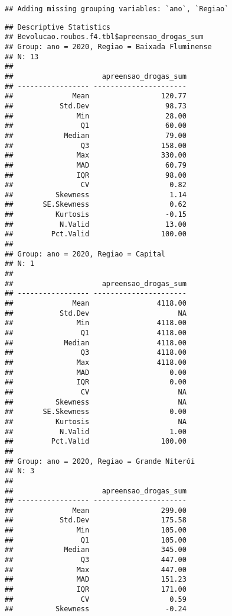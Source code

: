 \documentclass[
]{article}
\begin{document}
\begin{verbatim}
## Adding missing grouping variables: `ano`, `Regiao`
\end{verbatim}

\begin{verbatim}
## Descriptive Statistics  
## Bevolucao.roubos.f4.tbl$apreensao_drogas_sum  
## Group: ano = 2020, Regiao = Baixada Fluminense  
## N: 13  
## 
##                     apreensao_drogas_sum
## ----------------- ----------------------
##              Mean                 120.77
##           Std.Dev                  98.73
##               Min                  28.00
##                Q1                  60.00
##            Median                  79.00
##                Q3                 158.00
##               Max                 330.00
##               MAD                  60.79
##               IQR                  98.00
##                CV                   0.82
##          Skewness                   1.14
##       SE.Skewness                   0.62
##          Kurtosis                  -0.15
##           N.Valid                  13.00
##         Pct.Valid                 100.00
## 
## Group: ano = 2020, Regiao = Capital  
## N: 1  
## 
##                     apreensao_drogas_sum
## ----------------- ----------------------
##              Mean                4118.00
##           Std.Dev                     NA
##               Min                4118.00
##                Q1                4118.00
##            Median                4118.00
##                Q3                4118.00
##               Max                4118.00
##               MAD                   0.00
##               IQR                   0.00
##                CV                     NA
##          Skewness                     NA
##       SE.Skewness                   0.00
##          Kurtosis                     NA
##           N.Valid                   1.00
##         Pct.Valid                 100.00
## 
## Group: ano = 2020, Regiao = Grande Niterói  
## N: 3  
## 
##                     apreensao_drogas_sum
## ----------------- ----------------------
##              Mean                 299.00
##           Std.Dev                 175.58
##               Min                 105.00
##                Q1                 105.00
##            Median                 345.00
##                Q3                 447.00
##               Max                 447.00
##               MAD                 151.23
##               IQR                 171.00
##                CV                   0.59
##          Skewness                  -0.24

\end{verbatim}
\end{document}
